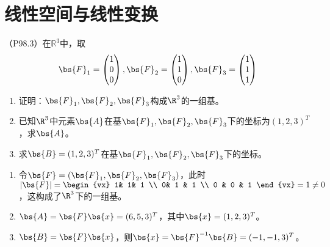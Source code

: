 \documentclass[12pt, a4paper, oneside, UTF8]{ctexbook}
\begin{document}
\else
\fi

\chapter{线性空间与线性变换}
\begin{question} 
    （P98.3）在$\mathbb{R}^3$中，取
    \begin{align*}
    \bs{F}_1=\begin{pmatrix}
        1\\
        0\\
        0
    \end{pmatrix},
    \bs{F}_2=\begin{pmatrix}
        1\\
        1\\
        0
    \end{pmatrix},
    \bs{F}_3=\begin{pmatrix}
        1\\
        1\\
        1
    \end{pmatrix}
\end{align*}
    \begin{enumerate}[label=(\arabic*)]
        \item 证明：$\bs{F}_1,\bs{F}_2,\bs{F}_3$构成${\R}^3$的一组基。
        \item 已知$\R^3$中元素$\bs{A}$在基$\bs{F}_1,\bs{F}_2,\bs{F}_3$下的坐标为$(1,2,3)^T$，求$\bs{A}$。
        \item 求$\bs{B}=(1,2,3)^T$在基$\bs{F}_1,\bs{F}_2,\bs{F}_3$下的坐标。
    \end{enumerate}
\end{question}

\begin{solution}
    \begin{enumerate}[label=(\arabic*)]
        \item 令$\bs{F}=(\bs{F}_1,\bs{F}_2,\bs{F}_3)$，此时$|\bs{F}|=\begin{vx}
        1& 1& 1 \\
        0& 1 & 1 \\
        0 & 0 & 1
        \end{vx}=1\neq 0$，这构成了$\R^3$下的一组基。
        \item $\bs{A}=\bs{F}\bs{x}=(6,5,3)^T$，其中$\bs{x}=(1,2,3)^T$。
        \item $\bs{B}=\bs{F}\bs{x}$，则$\bs{x}=\bs{F}^{-1}\bs{B}=(-1,-1,3)^T$。
    \end{enumerate}
\end{solution}
\end{document}
